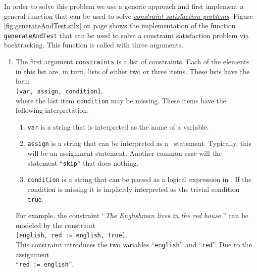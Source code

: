 In order to solve this problem we use a generic approach and first implement a general function that
can be used to solve
\href{https://en.wikipedia.org/wiki/Constraint_satisfaction_problem}{\emph{constraint satisfaction problems}}.  
Figure \ref{fig:generateAndTest.stlx} 
on page \pageref{fig:generateAndTest.stlx} shows the implementation of the function
\texttt{generateAndTest} that can be used to solve a constraint satisfaction problem via
backtracking.  This function is called with three arguments.
\begin{enumerate}
\item The first argument \texttt{constraints} is a list of constraints.  Each of the elements in
      this list are, in turn,  lists of either two or three items.  These lists have the form
      \\[0.2cm]
      \hspace*{1.3cm}
      \texttt{[var, assign, condition]},
      \\[0.2cm]
      where the last item \texttt{condition} may be missing.  These items have the following
      interpretation.
      \begin{enumerate}
      \item \texttt{var} is a string that is interpreted as the name of a variable.
      \item \texttt{assign} is a string that can be interpreted as a \setlx\ statement.  Typically,
            this will be an assignment statement.  Another common case will the statement
            ``\texttt{skip}'' that does nothing.
      \item \texttt{condition} is a string that can be parsed as a logical expression in \setlx.
            If the condition is missing it is implicitly interpreted as the trivial condition \texttt{true}.
      \end{enumerate}
      For example, the constraint ``\textsl{The Englishman lives in the red house.}'' can be
      modeled by the constraint
      \\[0.2cm]
      \hspace*{1.3cm}
      \texttt{[english, red := english, true]}.
      \\[0.2cm]
      This constraint introduces the two variables ``\texttt{english}'' and ``\texttt{red}''.
      Due to the assignment 
      \\[0.2cm]
      \hspace*{1.3cm}
      ``\texttt{red := english}'', 
      \\[0.2cm]

\end{enumerate}
